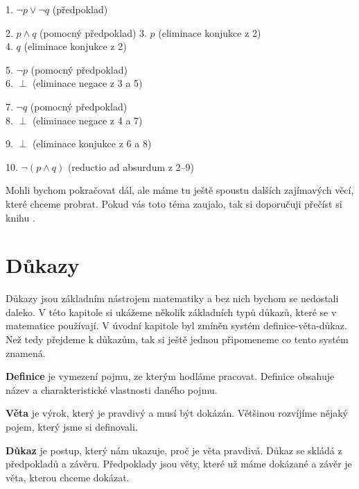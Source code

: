 \begin{example}
  \begin{proofbox}

    1. $\neg p \lor \neg q$ (předpoklad)
    \begin{proofbox}
      2. $p \land q$ (pomocný předpoklad)
      3. $p$ (eliminace konjukce z 2) \\
      4. $q$ (eliminace konjukce z 2)
      \begin{proofbox}
        5. $\neg p$ (pomocný předpoklad) \\
        6. $\perp$ (eliminace negace z 3 a 5)
      \end{proofbox}
      \begin{proofbox}
        7. $\neg q$ (pomocný předpoklad) \\
        8. $\perp$ (eliminace negace z 4 a 7)
      \end{proofbox}
      9. $\perp$ (eliminace konjukce z 6 a 8)
    \end{proofbox}
    10. $\neg(p \land q)$ (reductio ad absurdum z 2--9)
  \end{proofbox}

\end{example}

Mohli bychom pokračovat dál, ale máme tu ještě spoustu dalších zajímavých věcí, které chceme probrat. Pokud vás toto téma zaujalo, tak si doporučuji přečíst si knihu 
.

\section{Důkazy}
Důkazy jsou základním nástrojem matematiky a bez nich bychom se nedostali daleko. V této kapitole si ukážeme několik základních typů důkazů, které se v matematice používají. V úvodní kapitole byl zmíněn systém definice-věta-důkaz. Než tedy přejdeme k důkazům, tak si ještě jednou připomeneme co tento systém znamená.

\begin{definitionbox}
  \textbf{Definice} je vymezení pojmu, ze kterým hodláme pracovat. Definice obsahuje název a charakteristické vlastnosti daného pojmu.

  \textbf{Věta} je výrok, který je pravdivý a musí být dokázán. Většinou rozvíjíme nějaký pojem, který jsme si definovali.

  \textbf{Důkaz} je postup, který nám ukazuje, proč je věta pravdivá. Důkaz se skládá z předpokladů a závěru. Předpoklady jsou věty, které už máme dokázané a závěr je věta, kterou chceme dokázat.
\end{definitionbox}

